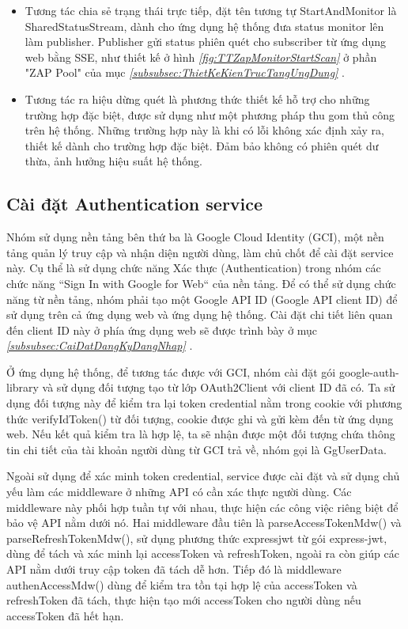 \begin{itemize}
  \item Tương tác chia sẻ trạng thái trực tiếp, đặt tên tương tự StartAndMonitor là SharedStatusStream, dành cho ứng dụng hệ thống đưa status monitor lên làm publisher.
        Publisher gửi status phiên quét cho subscriber từ ứng dụng web bằng SSE, như thiết kế ở hình \textit{\ref{fig:TTZapMonitorStartScan} } ở phần "ZAP Pool" của mục \textit{\ref{subsubsec:ThietKeKienTrucTangUngDung} }.
  \item Tương tác ra hiệu dừng quét là phương thức thiết kế hỗ trợ cho những trường hợp đặc biệt, được sử dụng như một phương pháp thu gom thủ công trên hệ thống. Những trường hợp này là khi có lỗi không xác định xảy ra, thiết kế dành cho trường hợp đặc biệt. Đảm bảo không có phiên quét dư thừa, ảnh hưởng hiệu suất hệ thống.
\end{itemize}

\subsection{Cài đặt Authentication service}

\tab Nhóm sử dụng nền tảng bên thứ ba là Google Cloud Identity (GCI), một nền tảng quản lý truy cập và nhận diện người dùng, làm chủ chốt để cài đặt service này.
Cụ thể là sử dụng chức năng Xác thực (Authentication) trong nhóm các chức năng “Sign In with Google for Web“ của nền tảng.
Để có thể sử dụng chức năng từ nền tảng, nhóm phải tạo một Google API ID (Google API client ID) để sử dụng trên cả ứng dụng web và ứng dụng hệ thống.
Cài đặt chi tiết liên quan đến client ID này ở phía ứng dụng web sẽ được trình bày ở mục \textit{\ref{subsubsec:CaiDatDangKyDangNhap} }.
\par

Ở ứng dụng hệ thống, để tương tác được với GCI, nhóm cài đặt gói google-auth-library và sử dụng đối tượng tạo từ lớp OAuth2Client với client ID đã có. Ta sử dụng đối tượng này để kiểm tra lại token credential nằm trong cookie với phương thức verifyIdToken() từ đối tượng, cookie được ghi và gửi kèm đến từ ứng dụng web. Nếu kết quả kiểm tra là hợp lệ, ta sẽ nhận được một đối tượng chứa thông tin chi tiết của tài khoản người dùng từ GCI trả về, nhóm gọi là GgUserData.
\par

Ngoài sử dụng để xác minh token credential, service được cài đặt và sử dụng chủ yếu làm các middleware ở những API có cần xác thực người dùng.
Các middleware này phối hợp tuần tự với nhau, thực hiện các công việc riêng biệt để bảo vệ API nằm dưới nó.
Hai middleware đầu tiên là parseAccessTokenMdw() và parseRefreshTokenMdw(), sử dụng phương thức expressjwt từ gói express-jwt, dùng để tách và xác minh lại accessToken và refreshToken, ngoài ra còn giúp các API nằm dưới truy cập token đã tách dễ hơn.
Tiếp đó là middleware authenAccessMdw() dùng để kiểm tra tồn tại hợp lệ của accessToken và refreshToken đã tách, thực hiện tạo mới accessToken cho người dùng nếu accessToken đã hết hạn.

